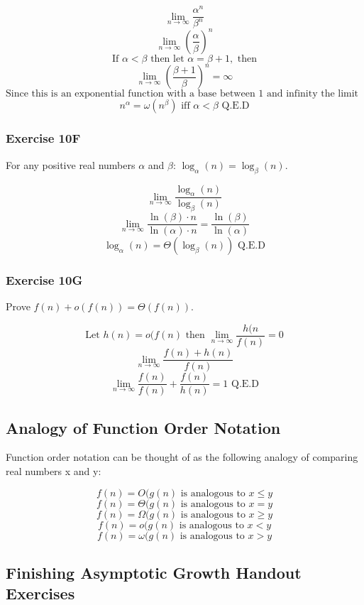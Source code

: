 \documentclass{article}
\begin{document}
$$\lim_{n \rightarrow \infty} \frac{\alpha^n}{{\beta}^n}$$
$$\lim_{n \rightarrow \infty} (\frac{\alpha}{\beta})^n$$
$$\text{If } \alpha < \beta \text{ then let }\alpha = \beta + 1, \text{ then} $$
$$\lim_{n \rightarrow \infty} (\frac{\beta + 1}{\beta})^n = \infty$$
$$\text{Since this is an exponential function with a base between 1 and infinity the limit approaches infinity}$$
$$n^{\alpha} = \omega(n^{\beta}) \text{ iff } \alpha < \beta \text{ Q.E.D}$$

\subsubsection{Exercise 10F}

For any positive real numbers $\alpha$ and $\beta$: $\log_{\alpha}(n) = \log_{\beta}(n)$.

$$\lim_{n \rightarrow \infty} \frac{\log_{\alpha}(n)}{\log_{\beta}(n)}$$
$$\lim_{n \rightarrow \infty} \frac{\ln({\beta}) \cdot n}{\ln(\alpha) \cdot n} = \frac{\ln(\beta)}{\ln(\alpha)}$$
$$\log_{\alpha}(n) = \Theta({\log_{\beta}(n)}) \text{ Q.E.D}$$

\subsubsection{Exercise 10G}

Prove $f(n) + o(f(n)) = \Theta(f(n))$.

$$\text{Let } h(n) = o(f(n) \text{ then } \lim_{n \rightarrow \infty} \frac{h(n}{f(n)} = 0$$
$$\lim_{n \rightarrow \infty} \frac{f(n) + h(n)}{f(n)}$$
$$\lim_{n \rightarrow \infty} \frac{f(n)}{f(n)} + \frac{f(n)}{h(n)} = 1 \text{ Q.E.D}$$

\subsection{Analogy of Function Order Notation}

Function order notation can be thought of as the following analogy of comparing real numbers x and y:

$$f(n) = O(g(n) \text{ is analogous to } x \le y$$
$$f(n) = \Theta(g(n) \text{ is analogous to } x = y$$
$$f(n) = \Omega(g(n) \text{ is analogous to } x \ge y$$
$$f(n) = o(g(n) \text{ is analogous to } x < y$$
$$f(n) = \omega(g(n) \text{ is analogous to } x > y$$

\subsection{Finishing Asymptotic Growth Handout Exercises}
\end{document}
